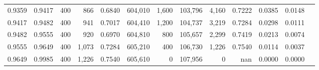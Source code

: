 \begin{tabular}{rrrrrrrrrrrrr}
0.9359 & 0.9417 &    400 &   866 &                                     0.6840 & 604,010 &   1,600 & 103,796 &   4,160 & 0.7222 & 0.0385 & 0.0148 \\
0.9417 & 0.9482 &    400 &   941 &                                     0.7017 & 604,410 &   1,200 & 104,737 &   3,219 & 0.7284 & 0.0298 & 0.0111 \\
0.9482 & 0.9555 &    400 &   920 &                                     0.6970 & 604,810 &     800 & 105,657 &   2,299 & 0.7419 & 0.0213 & 0.0074 \\
0.9555 & 0.9649 &    400 & 1,073 &                                     0.7284 & 605,210 &     400 & 106,730 &   1,226 & 0.7540 & 0.0114 & 0.0037 \\
0.9649 & 0.9985 &    400 & 1,226 &                                     0.7540 & 605,610 &       0 & 107,956 &       0 &    nan & 0.0000 & 0.0000 \\
\bottomrule
\end{tabular}
